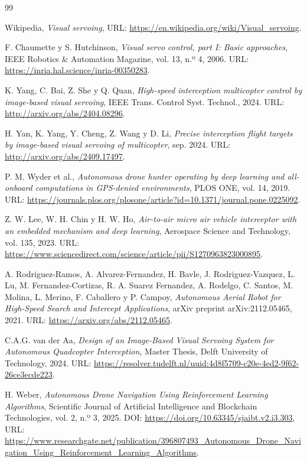 \begin{thebibliography}{99}

 Wikipedia, \textit{Visual servoing}, URL: \url{https://en.wikipedia.org/wiki/Visual_servoing}.

 F. Chaumette y S. Hutchinson, \textit{Visual servo control, part I: Basic approaches}, IEEE Robotics \& Automation Magazine, vol. 13, n.º 4, 2006. URL: \url{https://inria.hal.science/inria-00350283}.

 K. Yang, C. Bai, Z. She y Q. Quan, \textit{High-speed interception multicopter control by image-based visual servoing}, IEEE Trans. Control Syst. Technol., 2024. URL: \url{http://arxiv.org/abs/2404.08296}.

 H. Yan, K. Yang, Y. Cheng, Z. Wang y D. Li, \textit{Precise interception flight targets by image-based visual servoing of multicopter}, sep. 2024. URL: \url{http://arxiv.org/abs/2409.17497}.

 P. M. Wyder et al., \textit{Autonomous drone hunter operating by deep learning and all-onboard computations in GPS-denied environments}, PLOS ONE, vol. 14, 2019. URL: \url{https://journals.plos.org/plosone/article?id=10.1371/journal.pone.0225092}.

 Z. W. Lee, W. H. Chin y H. W. Ho, \textit{Air-to-air micro air vehicle interceptor with an embedded mechanism and deep learning}, Aerospace Science and Technology, vol. 135, 2023. URL: \url{https://www.sciencedirect.com/science/article/pii/S1270963823000895}.

 A. Rodriguez-Ramos, A. Alvarez-Fernandez, H. Bavle, J. Rodriguez-Vazquez, L. Lu, M. Fernandez-Cortizas, R. A. Suarez Fernandez, A. Rodelgo, C. Santos, M. Molina, L. Merino, F. Caballero y P. Campoy, \textit{Autonomous Aerial Robot for High-Speed Search and Intercept Applications}, arXiv preprint arXiv:2112.05465, 2021. URL: \url{https://arxiv.org/abs/2112.05465}.

 C.A.G. van der Aa, \textit{Design of an Image-Based Visual Servoing System for Autonomous Quadcopter Interception}, Master Thesis, Delft University of Technology, 2024. URL: \url{https://resolver.tudelft.nl/uuid:4d8f5709-c20e-4ed2-9f62-26ce3ecde223}.

 H. Weber, \textit{Autonomous Drone Navigation Using Reinforcement Learning Algorithms}, Scientific Journal of Artificial Intelligence and Blockchain Technologies, vol. 2, n.º 3, 2025. DOI: \url{https://doi.org/10.63345/sjaibt.v2.i3.303}, URL: \url{https://www.researchgate.net/publication/396807493_Autonomous_Drone_Navigation_Using_Reinforcement_Learning_Algorithms}.


\end{thebibliography}
